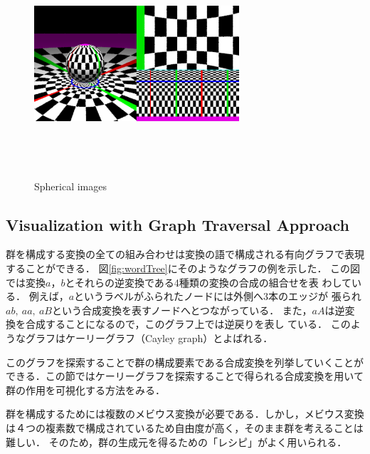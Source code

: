\begin{figure}[htbp]
\begin{minipage}{0.5\hsize}
  \label{fig:sphericalTranslation}
 \end{minipage}
 \begin{minipage}{0.5\hsize}
  \center
  \includegraphics[width=3in, height=3in, keepaspectratio]{../img/klein/sphericalScaling.pdf}
  \label{fig:sphericalScaling}
 \end{minipage}
 \caption{Spherical images}
 \label{fig:spherical}
\end{figure}

\subsection{Visualization with Graph Traversal Approach}

群を構成する変換の全ての組み合わせは変換の語で構成される有向グラフで表現
することができる．
図\ref{fig:wordTree}にそのようなグラフの例を示した．
この図では変換$a$，$b$とそれらの逆変換である4種類の変換の合成の組合せを表
わしている．
例えば，$a$というラベルがふられたノードには外側へ3本のエッジが
張られ$ab,~aa,~aB$という合成変換を表すノードへとつながっている．
また，$aA$は逆変換を合成することになるので，このグラフ上では逆戻りを表し
ている．
このようなグラフはケーリーグラフ（Cayley graph）とよばれる．

このグラフを探索することで群の構成要素である合成変換を列挙していくことが
できる．この節ではケーリーグラフを探索することで得られる合成変換を用いて
群の作用を可視化する方法をみる．

群を構成するためには複数のメビウス変換が必要である．しかし，メビウス変換
は４つの複素数で構成されているため自由度が高く，そのまま群を考えることは
難しい．
そのため，群の生成元を得るための「レシピ」がよく用いられる．

